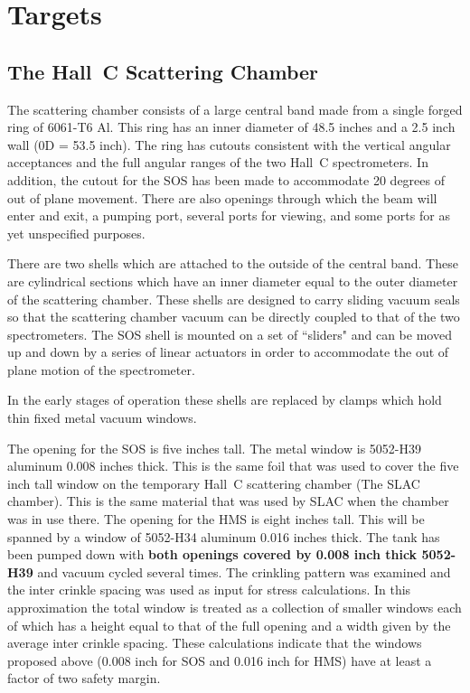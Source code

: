\chapter{Targets}

\section{The Hall~C Scattering Chamber}

The scattering chamber consists of a large central band made from a single
forged ring of 6061-T6 Al. This ring has an inner diameter of
48.5 inches and a  2.5 inch wall (0D = 53.5 inch). The ring has
cutouts consistent with the vertical angular acceptances and the
full angular ranges of the two Hall~C spectrometers. In addition,
the cutout for the SOS has been made to accommodate 20 degrees
of out of plane movement. There are also openings through which the beam
will enter and exit, a pumping port, several ports for viewing, and
some ports for as yet unspecified purposes.

There are two shells which are attached to the outside of the central
band. These are cylindrical sections which have an inner diameter
equal to the outer diameter of the scattering chamber. These shells
are designed to carry sliding vacuum seals so that the scattering
chamber vacuum can be directly coupled to that of the two spectrometers.
The SOS shell is mounted on a set of ``sliders" and can be moved
up and down by a series of linear actuators in order to accommodate the
out of plane motion of the spectrometer.

In the early stages of operation these shells are replaced by
clamps which hold thin fixed metal vacuum windows.

The opening for the SOS is five inches tall. The metal window is
5052-H39 aluminum 0.008 inches thick. This is the same foil that was used to
cover the five inch tall window on the temporary Hall~C scattering chamber
(The SLAC chamber). This is the same material that was used by SLAC when
the chamber was in use there.
The opening for the HMS
is eight inches tall. This will be spanned by a window of
5052-H34 aluminum 0.016 inches thick. The tank has been pumped down with
{\bf both openings covered by 0.008 inch thick 5052-H39 }
and vacuum cycled several
times. The crinkling pattern was examined and the inter crinkle spacing
was used as input for stress calculations. In this approximation the
total window is treated as a collection of smaller windows each of which
has a height equal to that of the full opening and a width given by the average
inter crinkle spacing. These calculations indicate that the windows
proposed above (0.008 inch for SOS and 0.016 inch for HMS) have at least
a factor of two safety margin.

